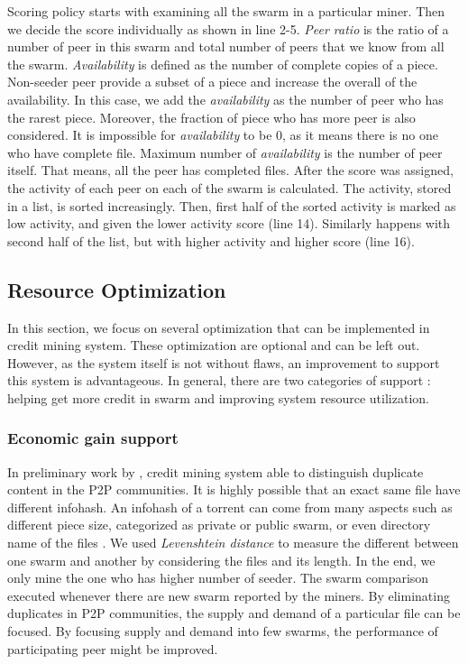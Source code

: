 Scoring policy starts with examining all the swarm in a particular miner. Then we decide the score individually as shown in line 2-5. \textit{Peer ratio} is the ratio of a number of peer in this swarm and total number of peers that we know from all the swarm. \textit{Availability} is defined as the number of complete copies of a piece. Non-seeder peer provide a subset of a piece and increase the overall of the availability. In this case, we add the \textit{availability} as the number of peer who has the rarest piece. Moreover, the fraction of piece who has more peer is also considered. It is impossible for \textit{availability} to be 0, as it means there is no one who have complete file. Maximum number of \textit{availability} is the number of peer itself. That means, all the peer has completed files. After the score was assigned, the activity of each peer on each of the swarm is calculated. The activity, stored in a list, is sorted increasingly. Then, first half of the sorted activity is marked as low activity, and given the lower activity score (line 14). Similarly happens with second half of the list, but with higher activity and higher score (line 16).

\subsection{Resource Optimization}
In this section, we focus on several optimization that can be implemented in credit mining system. These optimization are optional and can be left out. However, as the system itself is not without flaws, an improvement to support this system is advantageous. In general, there are two categories of support : helping get more credit in swarm and improving system resource utilization.

\subsubsection{Economic gain support}
In preliminary work by \citeauthor{2015:creditmining:capota}, credit mining system able to distinguish duplicate content in the P2P communities. It is highly possible that an exact same file have different infohash. An infohash of a torrent can come from many aspects such as different piece size, categorized as private or public swarm, or even directory name of the files \cite{2015:creditmining:capota}. We used \textit{Levenshtein distance} to measure the different between one swarm and another by considering the files and its length. In the end, we only mine the one who has higher number of seeder. The swarm comparison executed whenever there are new swarm reported by the miners. By eliminating duplicates in P2P communities, the supply and demand of a particular file can be focused. By focusing supply and demand into few swarms, the performance of participating peer might be improved.

